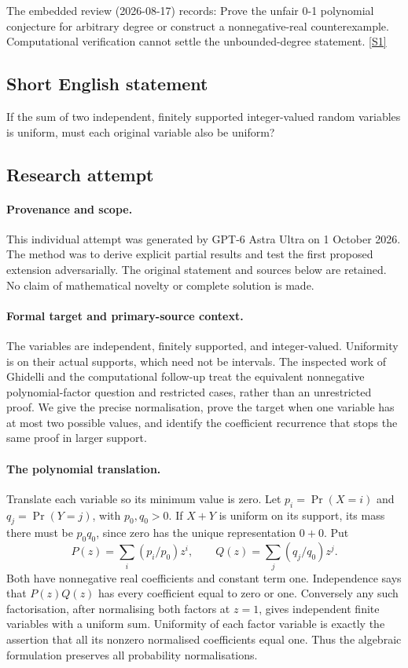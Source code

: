\documentclass[11pt,a4paper]{article}
\newcommand{\sref}[2]{\hyperlink{source:#1:#2}{[S#2]}}
\begin{document}
The embedded review (2026-08-17) records: Prove the unfair 0-1 polynomial conjecture for arbitrary degree or construct a nonnegative-real counterexample. Computational verification cannot settle the unbounded-degree statement. \sref{statement}{1}

\subsection{Short English statement}

If the sum of two independent, finitely supported integer-valued random variables is uniform, must each original variable also be uniform?

\subsection{Research attempt}

\paragraph{Provenance and scope.}
This individual attempt was generated by GPT-6 Astra Ultra on 1 October 2026. The method was to derive explicit partial results and test the first proposed extension adversarially. The original statement and sources below are retained. No claim of mathematical novelty or complete solution is made.

\paragraph{Formal target and primary-source context.}
The variables are independent, finitely supported, and integer-valued. Uniformity is on their actual supports, which need not be intervals. The inspected work of Ghidelli and the computational follow-up treat the equivalent nonnegative polynomial-factor question and restricted cases, rather than an unrestricted proof. We give the precise normalisation, prove the target when one variable has at most two possible values, and identify the coefficient recurrence that stops the same proof in larger support.

\paragraph{The polynomial translation.}
Translate each variable so its minimum value is zero. Let $p_i=\Pr(X=i)$ and $q_j=\Pr(Y=j)$, with $p_0,q_0>0$. If $X+Y$ is uniform on its support, its mass there must be $p_0q_0$, since zero has the unique representation $0+0$. Put
\[
 P(z)=\sum_i(p_i/p_0)z^i,\qquad Q(z)=\sum_j(q_j/q_0)z^j.
\]
Both have nonnegative real coefficients and constant term one. Independence says that $P(z)Q(z)$ has every coefficient equal to zero or one. Conversely any such factorisation, after normalising both factors at $z=1$, gives independent finite variables with a uniform sum. Uniformity of each factor variable is exactly the assertion that all its nonzero normalised coefficients equal one. Thus the algebraic formulation preserves all probability normalisations.
\end{document}
